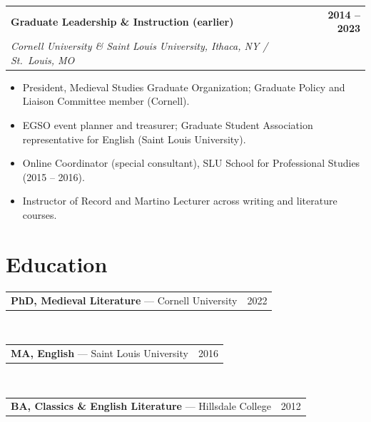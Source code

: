 \documentclass[11pt,letterpaper]{article}
\makeatletter
\newcommand{\entry}[4]{%
  \noindent\begin{tabularx}{\linewidth}{@{}X r@{}}
    \textbf{#1} & \textbf{#4}\\
    \textit{#2, #3} & \\
  \end{tabularx}\vspace{1pt}}
\newcommand{\edu}[3]{%
  \noindent\begin{tabularx}{\linewidth}{@{}X r@{}}%
    \textbf{#1} \textnormal{— #2} & #3\\
  \end{tabularx}}
\makeatother
\begin{document}
\entry{Graduate Leadership \& Instruction (earlier)}{Cornell University \& Saint Louis University}{Ithaca, NY / St.\ Louis, MO}{2014 -- 2023}
\begin{itemize}
  \item President, Medieval Studies Graduate Organization; Graduate Policy and Liaison Committee member (Cornell).
  \item EGSO event planner and treasurer; Graduate Student Association representative for English (Saint Louis University).
  \item Online Coordinator (special consultant), SLU School for Professional Studies (2015 -- 2016).
  \item Instructor of Record and Martino Lecturer across writing and literature courses.
\end{itemize}

\section{Education}
\edu{PhD, Medieval Literature}{Cornell University}{2022}\\[3pt]
\edu{MA, English}{Saint Louis University}{2016}\\[3pt]
\edu{BA, Classics \& English Literature}{Hillsdale College}{2012}
\end{document}
